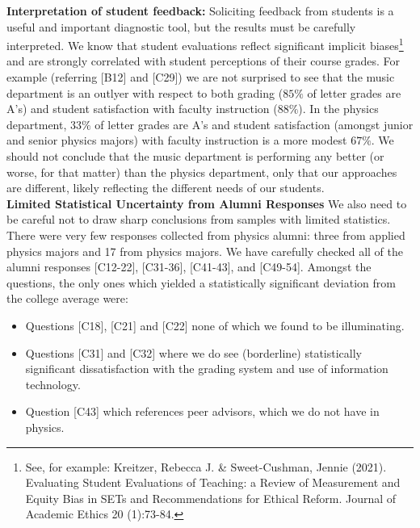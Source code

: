 \documentclass[12pt]{article}
\begin{document}
\noindent
{\bf Interpretation of student feedback:} Soliciting feedback from
students is a useful and important diagnostic tool, but the results
must be carefully interpreted.  We know that student evaluations
reflect significant implicit biases\footnote{See,
for example: Kreitzer, Rebecca J. \& Sweet-Cushman, Jennie
(2021). Evaluating Student Evaluations of Teaching: a Review of
Measurement and Equity Bias in SETs and Recommendations for Ethical
Reform. Journal of Academic Ethics 20 (1):73-84.}  and are strongly
correlated with student perceptions of their course grades.  For
example (referring [B12] and [C29]) we are not surprised to see that the
music department is an outlyer with respect to both grading ($85\%$ of
letter grades are A's) and student satisfaction with faculty
instruction ($88\%$).  In the physics department, $33\%$ of letter
grades are A's and student satisfaction (amongst junior and senior physics majors) with faculty
instruction is a more modest $67\%$.  We should not conclude that the
music department is performing any better (or worse, for that matter)
than the physics department, only that our approaches are different,
likely reflecting the different needs of our students.\\[3pt]

\noindent
{\bf Limited Statistical Uncertainty from Alumni Responses}
We also need to be careful not to draw sharp conclusions from samples
with limited statistics.  There were very few responses collected from
physics alumni: three from applied physics majors and 17 from physics
majors.  We have carefully checked all of the alumni responses
[C12-22], [C31-36], [C41-43], and [C49-54].  Amongst the questions,
the only ones which yielded a statistically significant deviation from
the college average were:
\begin{itemize}
  \item Questions [C18], [C21] and [C22] none of which we found to be illuminating.
  \item Questions [C31] and [C32] where we do see (borderline) statistically significant dissatisfaction with the grading system and use of information technology.   
  \item Question [C43] which references peer advisors, which we do not have in physics.
\end{itemize}
\end{document}
